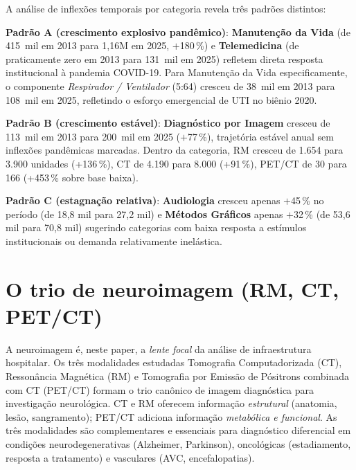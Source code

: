 \documentclass[12pt,a4paper,oneside]{article}
\begin{document}
A análise de inflexões temporais por categoria revela três
padrões distintos:

\textbf{Padrão A (crescimento explosivo pandêmico)}:
\textbf{Manutenção da Vida} (de 415~mil em 2013 para 1,16M em
2025, $+$180\,\%) e \textbf{Telemedicina} (de praticamente zero em
2013 para 131~mil em 2025) refletem direta resposta institucional
à pandemia COVID-19. Para Manutenção da Vida especificamente, o
componente \textit{Respirador / Ventilador} (5{:}64) cresceu de
38~mil em 2013 para 108~mil em 2025, refletindo o esforço
emergencial de UTI no biênio 2020.

\textbf{Padrão B (crescimento estável)}:
\textbf{Diagnóstico por Imagem} cresceu de 113~mil em 2013 para
200~mil em 2025 ($+$77\,\%), trajetória estável anual sem
inflexões pandêmicas marcadas. Dentro da categoria, RM cresceu
de 1.654 para 3.900 unidades (+136\,\%), CT de 4.190 para 8.000
(+91\,\%), PET/CT de 30 para 166 (+453\,\% sobre base baixa).

\textbf{Padrão C (estagnação relativa)}:
\textbf{Audiologia} cresceu apenas $+$45\,\% no período (de 18,8
mil para 27,2 mil) e \textbf{Métodos Gráficos} apenas $+$32\,\%
(de 53,6 mil para 70,8 mil) \textemdash{} sugerindo categorias com
baixa resposta a estímulos institucionais ou demanda relativamente
inelástica.

\section{O trio de neuroimagem (RM, CT, PET/CT)}\label{sec:neuro}

A neuroimagem é, neste paper, a \textit{lente focal} da análise
de infraestrutura hospitalar. Os três modalidades estudadas
\textemdash{} Tomografia Computadorizada (CT), Ressonância
Magnética (RM) e Tomografia por Emissão de Pósitrons combinada com
CT (PET/CT) \textemdash{} formam o trio canônico de imagem
diagnóstica para investigação neurológica. CT e RM oferecem
informação \textit{estrutural} (anatomia, lesão, sangramento); PET/CT
adiciona informação \textit{metabólica e funcional}. As três
modalidades são complementares e essenciais para diagnóstico
diferencial em condições neurodegenerativas (Alzheimer, Parkinson),
oncológicas (estadiamento, resposta a tratamento) e vasculares
(AVC, encefalopatias).
\end{document}
